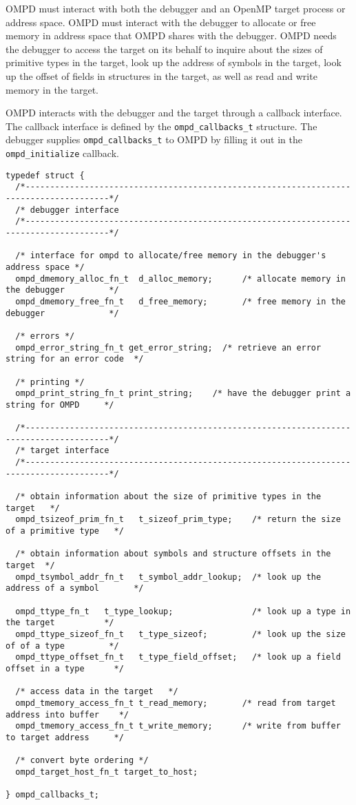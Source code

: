 \documentclass{article}
\begin{document}
OMPD must interact with both the debugger and an OpenMP target process or address space.
OMPD must interact with the debugger to allocate or free memory in address space that OMPD shares with the debugger.
OMPD needs the debugger to access the target on its behalf to
inquire about the sizes of primitive types in the target, look up the address of symbols in the target, look up the offset of fields in structures in the target, as well as read and write memory in the target. 

OMPD interacts with the debugger and the target through a callback interface.
The callback interface  is defined by the \verb|ompd_callbacks_t| structure. The debugger  supplies \verb|ompd_callbacks_t| to OMPD by filling it out  in the \verb|ompd_initialize| callback. 


\begin{verbatim}
typedef struct {
  /*---------------------------------------------------------------------------------------*/
  /* debugger interface
  /*---------------------------------------------------------------------------------------*/
  
  /* interface for ompd to allocate/free memory in the debugger's address space */
  ompd_dmemory_alloc_fn_t  d_alloc_memory;      /* allocate memory in the debugger         */
  ompd_dmemory_free_fn_t   d_free_memory;       /* free memory in the debugger             */
  
  /* errors */
  ompd_error_string_fn_t get_error_string;  /* retrieve an error string for an error code  */
  
  /* printing */
  ompd_print_string_fn_t print_string;    /* have the debugger print a string for OMPD     */
    
  /*---------------------------------------------------------------------------------------*/
  /* target interface
  /*---------------------------------------------------------------------------------------*/
  
  /* obtain information about the size of primitive types in the target   */
  ompd_tsizeof_prim_fn_t   t_sizeof_prim_type;    /* return the size of a primitive type   */
  
  /* obtain information about symbols and structure offsets in the target  */
  ompd_tsymbol_addr_fn_t   t_symbol_addr_lookup;  /* look up the address of a symbol       */
  
  ompd_ttype_fn_t   t_type_lookup;                /* look up a type in the target          */
  ompd_ttype_sizeof_fn_t   t_type_sizeof;         /* look up the size of of a type         */
  ompd_ttype_offset_fn_t   t_type_field_offset;   /* look up a field offset in a type      */
  
  /* access data in the target   */
  ompd_tmemory_access_fn_t t_read_memory;       /* read from target address into buffer    */
  ompd_tmemory_access_fn_t t_write_memory;      /* write from buffer to target address     */
  
  /* convert byte ordering */
  ompd_target_host_fn_t target_to_host; 
  
} ompd_callbacks_t;
\end{verbatim}

 \clearpage
 
 
\end{document}
